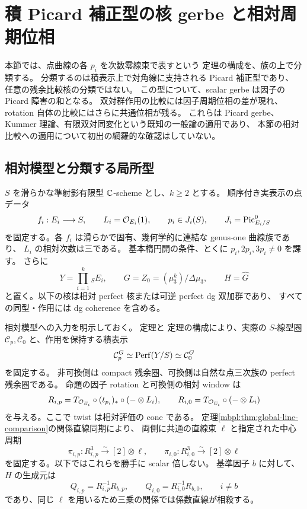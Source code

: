 \section{積 Picard 補正型の核 gerbe と相対周期位相}
\label{mbpd:sec:picard-descent}

本節では、点曲線の各 $p_i$ を次数零線束で表すという
定理の構成を、族の上で分類する。
分類するのは積表示上で対角線に支持される Picard 補正型であり、
任意の残余比較核の分類ではない。
この型について、scalar gerbe は因子の Picard 障害の和となる。
双対群作用の比較には因子周期位相の差が現れ、
rotation 自体の比較にはさらに共通位相が残る。
これらは Picard gerbe、Kummer 理論、有限双対同変化という既知の一般論の適用であり、
本節の相対比較への適用について初出の網羅的な確認はしていない。

\subsection{相対模型と分類する局所型}

$S$ を滑らかな準射影有限型 $\mathbb C$-scheme とし、$k\geq2$ とする。
順序付き実表示の点データ
\[
 f_i:E_i\longrightarrow S,\qquad
 L_i=\mathcal O_{E_i}(1),\qquad p_i\in J_i(S),\qquad
 J_i=\operatorname{Pic}^0_{E_i/S}
\]
を固定する。各 $f_i$ は滑らかで固有、幾何学的に連結な genus-one 曲線族であり、
$L_i$ の相対次数は三である。
基本楕円開の条件、とくに $p_i,2p_i,3p_i\ne0$ を課す。
さらに
\[
 Y=\prod_{i=1}^k{}_S E_i,\qquad
 G=Z_0=(\mu_3^k)/\Delta\mu_3,
 \qquad H=\widehat G
\]
と置く。以下の核は相対 perfect 核または可逆 perfect dg 双加群であり、
すべての同型・作用には dg coherence を含める。

相対模型への入力を明示しておく。
定理と
定理の構成により、実際の $S$-線型圏
$\mathcal C_p,\mathcal C_0$ と、作用を保持する積表示
\begin{equation}\label{mbpd:eq:relative-models}
 \mathcal C_p^G\simeq\operatorname{Perf}(Y/S)\simeq\mathcal C_0^G
\end{equation}
を固定する。
非可換側は compact 残余圏、可換側は自然な点三次族の perfect 残余圏である。
命題の因子 rotation と可換側の相対 window は
\begin{equation}\label{mbpd:eq:factor-rotations}
 R_{i,p}=T_{\mathcal O_{E_i}}\circ(t_{p_i})_*\circ(-\otimes L_i),
 \qquad R_{i,0}=T_{\mathcal O_{E_i}}\circ(-\otimes L_i)
\end{equation}
を与える。ここで twist は相対評価の cone である。
定理\ref{mbpl:thm:global-line-comparison}の関係直線同期により、
両側に共通の直線束 $\ell$ と指定された中心周期
\begin{equation}\label{mbpd:eq:periods}
 \pi_{i,p}:R_{i,p}^3\xrightarrow{\sim}[2]\otimes\ell,
 \qquad
 \pi_{i,0}:R_{i,0}^3\xrightarrow{\sim}[2]\otimes\ell
\end{equation}
を固定する。以下ではこれらを勝手に scalar 倍しない。
基準因子 $b$ に対して、$H$ の生成元は
\[
 Q_{i,p}=R_{i,p}^{-1}R_{b,p},\qquad
 Q_{i,0}=R_{i,0}^{-1}R_{b,0},\qquad i\ne b
\]
であり、同じ $\ell$ を用いるため三乗の関係では係数直線が相殺する。

